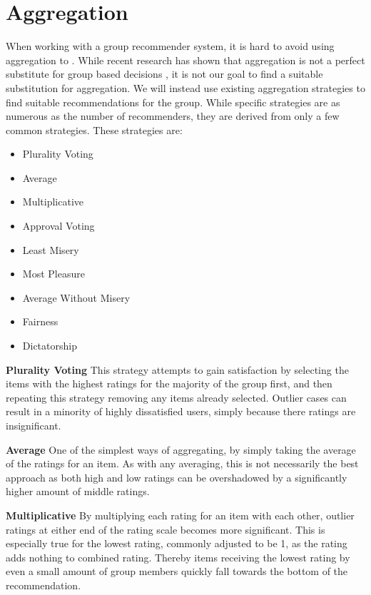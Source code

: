 \section{Aggregation} \label{bg:aggregation}
When working with a group recommender system, it is hard to avoid using aggregation to . While recent research has shown that aggregation is not a perfect substitute for group based decisions , it is not our goal to find a suitable substitution for aggregation. We will instead use existing aggregation strategies to find suitable recommendations for the group. While specific strategies are as numerous as the number of recommenders, they are derived from only a few common strategies. These strategies are:

\begin{itemize}
	\item Plurality Voting
	\item Average
	\item Multiplicative
	\item Approval Voting
	\item Least Misery
	\item Most Pleasure
	\item Average Without Misery
	\item Fairness
	\item Dictatorship
\end{itemize}

\textbf{Plurality Voting}
This strategy attempts to gain satisfaction by selecting the items with the highest ratings for the majority of the group first, and then repeating this strategy removing any items already selected. Outlier cases can result in a minority of highly dissatisfied users, simply because there ratings are insignificant.

\textbf{Average}
One of the simplest ways of aggregating, by simply taking the average of the ratings for an item. As with any averaging, this is not necessarily the best approach as both high and low ratings can be overshadowed by a significantly higher amount of middle ratings.

\textbf{Multiplicative}
By multiplying each rating for an item with each other, outlier ratings at either end of the rating scale becomes more significant. This is especially true for the lowest rating, commonly adjusted to be 1, as the rating adds nothing to combined rating. Thereby items receiving the lowest rating by even a small amount of group members quickly fall towards the bottom of the recommendation.

